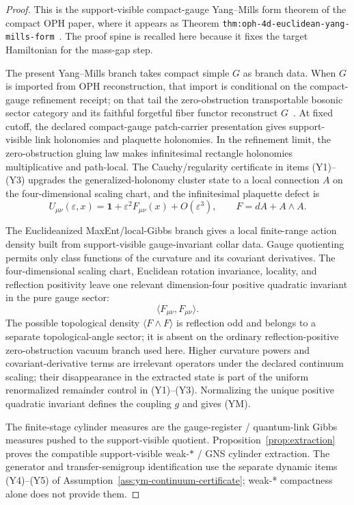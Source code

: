 \documentclass[11pt]{article}
\numberwithin{equation}{section}
\theoremstyle{remark}
\begin{document}
\begin{proof}
This is the support-visible compact-gauge Yang--Mills form theorem of the compact OPH paper,
where it appears as Theorem \texttt{thm:oph-4d-euclidean-yang-mills-form}~\cite{oph2}. The proof
spine is recalled here because it fixes the target Hamiltonian for the mass-gap step.

The present Yang--Mills branch takes compact simple \(G\) as branch data. When \(G\) is imported
from OPH reconstruction, that import is conditional on the compact-gauge refinement receipt; on
that tail the zero-obstruction transportable bosonic sector category and its faithful forgetful
fiber functor reconstruct \(G\)~\cite{oph2}. At fixed cutoff, the declared compact-gauge patch-carrier presentation gives
support-visible link holonomies and plaquette holonomies. In the refinement limit, the
zero-obstruction gluing law makes infinitesimal rectangle holonomies multiplicative and
path-local. The Cauchy/regularity certificate in items (Y1)--(Y3) upgrades the
generalized-holonomy cluster state to a local connection \(A\) on the four-dimensional scaling
chart, and
the infinitesimal plaquette defect is
\[
U_{\mu\nu}(\varepsilon,x)
=
\mathbf 1+\varepsilon^2F_{\mu\nu}(x)+O(\varepsilon^3),
\qquad
F=dA+A\wedge A.
\]

The Euclideanized MaxEnt/local-Gibbs branch gives a local finite-range action density built from
support-visible gauge-invariant collar data. Gauge quotienting permits only class functions of
the curvature and its covariant derivatives. The four-dimensional scaling chart, Euclidean
rotation invariance, locality, and reflection positivity leave one relevant dimension-four
positive quadratic invariant in the pure gauge sector:
\[
\langle F_{\mu\nu},F_{\mu\nu}\rangle.
\]
The possible topological density \(\langle F\wedge F\rangle\) is reflection odd and belongs to a
separate topological-angle sector; it is absent on the ordinary reflection-positive
zero-obstruction vacuum branch used here. Higher curvature powers and covariant-derivative terms
are irrelevant operators under the declared continuum scaling; their disappearance in the
extracted state is part of the uniform renormalized remainder control in (Y1)--(Y3). Normalizing
the unique positive quadratic invariant defines the coupling \(g\) and gives (YM).

The finite-stage cylinder measures are the gauge-register / quantum-link Gibbs measures pushed to
the support-visible quotient. Proposition~\ref{prop:extraction} proves the compatible
support-visible weak-\(*\) / GNS cylinder extraction. The generator and transfer-semigroup
identification use the separate dynamic items (Y4)--(Y5) of
Assumption~\ref{ass:ym-continuum-certificate}; weak-* compactness alone does not provide them.
\end{proof}
\end{document}
